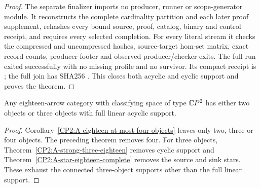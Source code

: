 \begin{proof}
The separate finalizer
imports no producer, runner or scope-generator module.
It reconstructs the complete cardinality partition and
each later proof supplement, rehashes every bound
source, proof, catalog, binary and control receipt,
and requires every selected completion. For every
literal stream it checks the compressed and uncompressed
hashes, source-target hom-set matrix, exact record counts,
producer footer and observed producer/checker exits.
The full run exited successfully with no missing profile
and no survivor. Its compact receipt is
;
the full join has SHA256
.
This closes both acyclic and cyclic support and proves
the theorem.
\end{proof}

\begin{corollary}
\label{CP2:A-eighteen-two-or-linear-three}
Any eighteen-arrow category with classifying space of
type $\mathbb{C}P^2$ has either two objects or three objects
with full linear acyclic support.
\end{corollary}
\begin{proof}
Corollary~\ref{CP2:A-eighteen-at-most-four-objects}
leaves only two, three or four objects. The preceding
theorem removes four. For three objects,
Theorem~\ref{CP2:A-strong-three-eighteen} removes cyclic
support and Theorem~\ref{CP2:A-star-eighteen-complete}
removes the source and sink stars. These exhaust the
connected three-object supports other than the full
linear support.
\end{proof}
